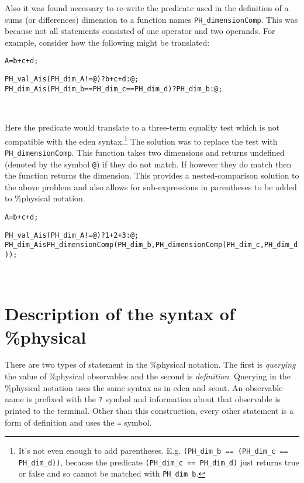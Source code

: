 \documentclass[a4paper]{article}
\newenvironment{boxcode}{\begin{lrbox}{\savepar}
	\begin{minipage}[b]{\textwidth}\begin{alltt}}
{\end{alltt}\end{minipage}\end{lrbox}\fbox{\usebox{\savepar}}\ \\}
\begin{document}
Also it was found necessary to re-write the predicate used in the definition of 
a
sums (or differences) dimension to a function names \texttt{PH\_dimensionComp}. 
This was because not all statements 
consisted of one operator and two operands. For example, consider how the
following might be translated:

\begin{alltt}
%physical
A = b+c+d;
\end{alltt}
\begin{boxcode}
PH_val_A is (PH_dim_A != @) ? b + c + d : @;
PH_dim_A is (PH_dim_b == PH_dim_c == PH_dim_d) ? PH_dim_b : @;
\end{boxcode}

Here the predicate would translate to a three-term equality test which is not
compatible with the eden syntax.\footnote{It's not even enough to add 
parentheses. E.g.
\texttt{(PH\_dim\_b == (PH\_dim\_c == PH\_dim\_d))}, because the predicate 
\texttt{(PH\_dim\_c == PH\_dim\_d)}
just returns true or false and so cannot be matched with \texttt{PH\_dim\_b}.}
 The solution was to replace the test with
\texttt{PH\_dimensionComp}. This function takes two dimensions and returns 
undefined (denoted by the symbol \texttt{@}) if they do not match. If however 
they do match then the 
function returns the dimension. This provides a nested-comparison solution to
the above problem and also allows for sub-expressions in parentheses to be 
added to \%physical notation.

\begin{alltt}
%physical
A = b+c+d;
\end{alltt}
\begin{boxcode}
PH_val_A is (PH_dim_A != @) ? 1 + 2 + 3 : @;
PH_dim_A is  PH_dimensionComp(PH_dim_b,PH_dimensionComp(PH_dim_c,PH_dim_d));
\end{boxcode}

\section{Description of the syntax of \%physical}

There are two types of statement in the \%physical notation. The first is
\emph{querying} the value of \%physical observables and the second is 
\emph{definition}. Querying in the \%physical notation 
uses the same syntax as in eden and scout. An observable name is
prefixed with the \texttt{?} symbol and information about that observable
is printed to the terminal. Other than this construction, every other
statement is a form of definition and uses the \texttt{=} symbol.
\end{document}
